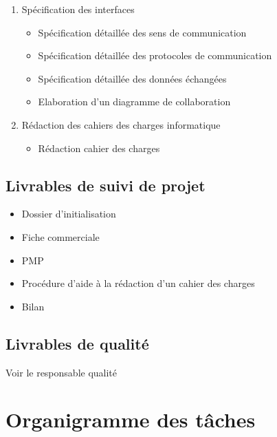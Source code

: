 \begin{itemize}
\begin{enumerate}
\item Spécification des interfaces
\begin{itemize}    
\item Spécification détaillée des sens de communication
\item Spécification détaillée des protocoles de communication
\item Spécification détaillée des données échangées
\item Elaboration d'un diagramme de collaboration
\end{itemize}        

\item Rédaction des cahiers des charges informatique
\begin{itemize}
\item Rédaction cahier des charges 
\end{itemize}
\end{enumerate}


\end{itemize}
\subsection{Livrables de suivi de projet}
\begin{itemize}
\item Dossier d'initialisation
\item Fiche commerciale
\item PMP
\item Procédure d'aide à la rédaction d'un cahier des charges
\item Bilan
\end{itemize}
\subsection{Livrables de qualité}
Voir le responsable qualité
\section{Organigramme des tâches}
